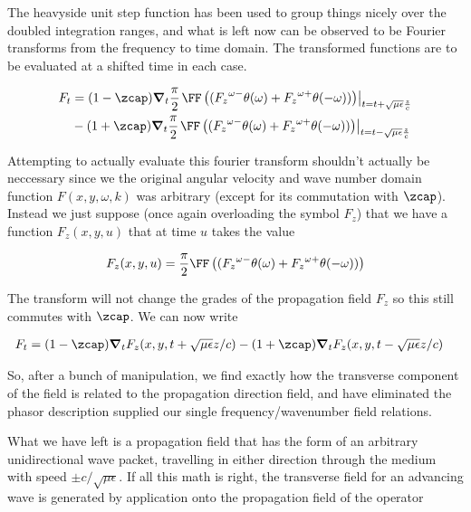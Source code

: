 The heavyside unit step function has been used to group things nicely over the doubled integration ranges, and what is left now can be observed to be Fourier transforms from the frequency to time domain.  The transformed functions are to be evaluated at a shifted time in each case.

\begin{align*}%
F_t 
&= 
(1 - \zcap) \spacegrad_t
\frac{\pi}{2}{\left.\FF\left( ({F_z}^{\omega-}\theta(\omega) + {F_z}^{\omega+}\theta(-\omega)) \right)\right\vert}_{t=t + \sqrt{\mu\epsilon}\frac{z}{c}} \\
&
-(1 + \zcap) \spacegrad_t
\frac{\pi}{2}{\left.\FF\left( ({F_z}^{\omega-}\theta(\omega) + {F_z}^{\omega+}\theta(-\omega)) \right)\right\vert}_{t=t - \sqrt{\mu\epsilon}\frac{z}{c}}
\end{align*}

Attempting to actually evaluate this fourier transform shouldn't actually be neccessary since we the original angular velocity and wave number domain function $F(x,y,\omega,k)$ was arbitrary (except for its commutation with $\zcap$).  Instead we just suppose (once again overloading the symbol $F_z$) that we have a function $F_z(x,y,u)$ that at time $u$ takes the value

\begin{align*}
F_z(x,y,u) = \frac{\pi}{2}\FF\left( ({F_z}^{\omega-}\theta(\omega) + {F_z}^{\omega+}\theta(-\omega)) \right)
\end{align*}

The transform will not change the grades of the propagation field $F_z$ so this still commutes with $\zcap$.  We can now write

\begin{align}\label{eqn:waveguideRetardedAdvanced:fooZ}
F_t 
&= 
(1 - \zcap) \spacegrad_t F_z(x,y, t + \sqrt{\mu\epsilon}{z}/{c})
-(1 + \zcap) \spacegrad_t F_z(x,y, t - \sqrt{\mu\epsilon}{z}/{c})
\end{align}

So, after a bunch of manipulation, we find exactly how the transverse component of the field is related to the propagation direction field, and have eliminated the phasor description supplied our single frequency/wavenumber field relations.

What we have left is a propagation field that has the form of an arbitrary unidirectional wave packet, travelling in either direction through the medium with speed $\pm c/\sqrt{\mu\epsilon}$.  If all this math is right, the transverse field for an advancing wave is generated by application onto the propagation field of the operator


